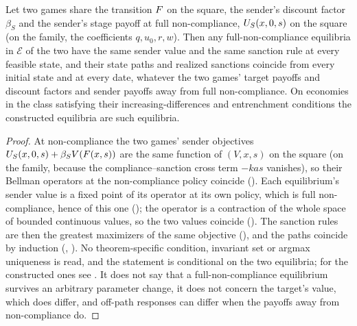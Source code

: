 \begin{proposition}
\label{prop:branch-invariance}
Let two games share the transition $F$ on the square, the sender's discount
factor $\beta_S$ and the sender's stage payoff at full non-compliance,
$U_S(x,0,s)$ on the square (on the family, the coefficients $q,u_0,r,w$). Then
any full-non-compliance equilibria in $\mathcal E$ of the two have the same sender value
and the same sanction rule at every feasible state, and their state
paths and realized sanctions coincide from every initial state and at every
date, whatever the two games' target payoffs and discount factors and sender
payoffs away from full non-compliance. On economies in the class satisfying their increasing-differences
and entrenchment conditions the constructed equilibria are such equilibria.
\end{proposition}

\begin{proof}
At non-compliance the two games' sender objectives $U_S(x,0,s)+\beta_SV(F(x,s))$
are the same function of $(V,x,s)$ on the square (on the family, because the
compliance--sanction cross term $-kas$ vanishes), so their Bellman operators at the non-compliance
policy coincide (). Each
equilibrium's sender value is a fixed point of its operator at its own policy,
which is full non-compliance, hence of this one
(); the operator is a contraction of the
whole space of bounded continuous values, so the two values coincide
(). The sanction rules are then the
greatest maximizers of the same objective
(), and the paths coincide by
induction (,
). No theorem-specific condition, invariant set or argmax
uniqueness is read, and the statement is conditional on the two equilibria;
for the constructed ones see . It
does not say that a full-non-compliance equilibrium survives an arbitrary parameter change, it
does not concern the target's value, which does differ, and off-path responses
can differ when the payoffs away from non-compliance do.
\end{proof}


